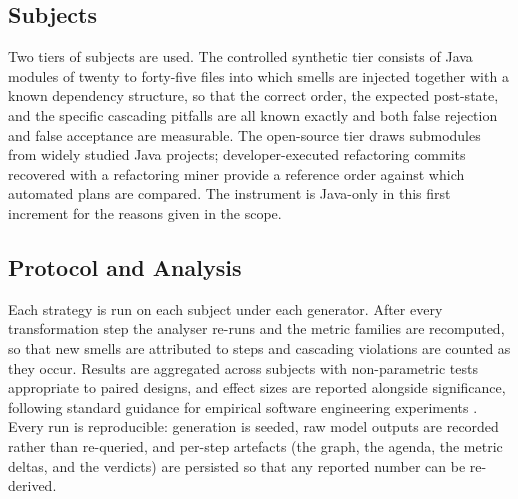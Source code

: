 \documentclass[journal,onecolumn,11pt]{IEEEtran}
\begin{document}
\subsection{Subjects}
Two tiers of subjects are used. The controlled synthetic tier consists of Java modules of twenty to forty-five files into which smells are injected together with a known dependency structure, so that the correct order, the expected post-state, and the specific cascading pitfalls are all known exactly and both false rejection and false acceptance are measurable. The open-source tier draws submodules from widely studied Java projects; developer-executed refactoring commits recovered with a refactoring miner \cite{tsantalis2022} provide a reference order against which automated plans are compared. The instrument is Java-only in this first increment for the reasons given in the scope.

\subsection{Protocol and Analysis}
Each strategy is run on each subject under each generator. After every transformation step the analyser re-runs and the metric families are recomputed, so that new smells are attributed to steps and cascading violations are counted as they occur. Results are aggregated across subjects with non-parametric tests appropriate to paired designs, and effect sizes are reported alongside significance, following standard guidance for empirical software engineering experiments \cite{wohlin2012}. Every run is reproducible: generation is seeded, raw model outputs are recorded rather than re-queried, and per-step artefacts (the graph, the agenda, the metric deltas, and the verdicts) are persisted so that any reported number can be re-derived.

\end{document}
